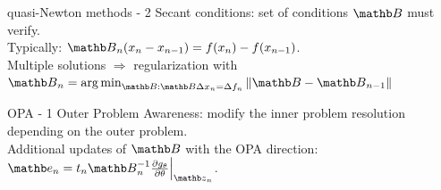 \begin{frame}{quasi-Newton methods - 2}
    Secant conditions: set of conditions $\Bb$ must verify.\\
    Typically: $\Bb_n(x_n - x_{n-1}) = f(x_n) - f(x_{n-1})$.\\
    Multiple solutions $\Rightarrow$ regularization with $\Bb_n = \argmin_{\Bb: \Bb \Delta x_n = \Delta f_n} \|\Bb - \Bb_{n-1}\|$
\end{frame}

\begin{frame}{OPA - 1}
    Outer Problem Awareness: modify the inner problem resolution depending on the outer problem.\\

    Additional updates of $\Bb$ with the OPA direction: $\eb_n = t_n \Bb_n^{-1} \frac{\partial g_{\theta}}{\partial \theta}\Bigr|_{\zb_n}$.
\end{frame}

